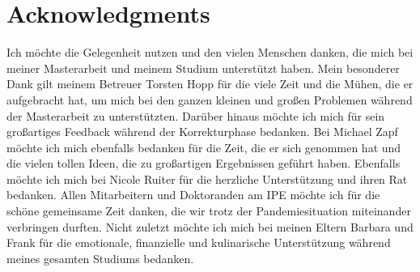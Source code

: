 \chapter*{Acknowledgments}


Ich möchte die Gelegenheit nutzen und den vielen Menschen danken, die mich bei meiner Masterarbeit und meinem Studium unterstützt haben. Mein besonderer Dank gilt meinem Betreuer Torsten Hopp für die viele Zeit und die Mühen, die er aufgebracht hat, um mich bei den ganzen kleinen und großen Problemen während der Masterarbeit zu unterstützten. Darüber hinaus möchte ich mich für sein großartiges Feedback während der Korrekturphase bedanken. Bei Michael Zapf möchte ich mich ebenfalls bedanken für die Zeit, die er sich genommen hat und die vielen tollen Ideen, die zu großartigen Ergebnissen geführt haben.  Ebenfalls möchte ich mich bei Nicole Ruiter für die herzliche Unterstützung und ihren Rat bedanken.
Allen Mitarbeitern und Doktoranden am IPE möchte ich für die schöne gemeinsame Zeit danken, die wir trotz der Pandemiesituation miteinander verbringen durften. Nicht zuletzt möchte ich mich bei meinen Eltern Barbara und Frank für die emotionale, finanzielle und kulinarische Unterstützung während meines gesamten Studiums bedanken.